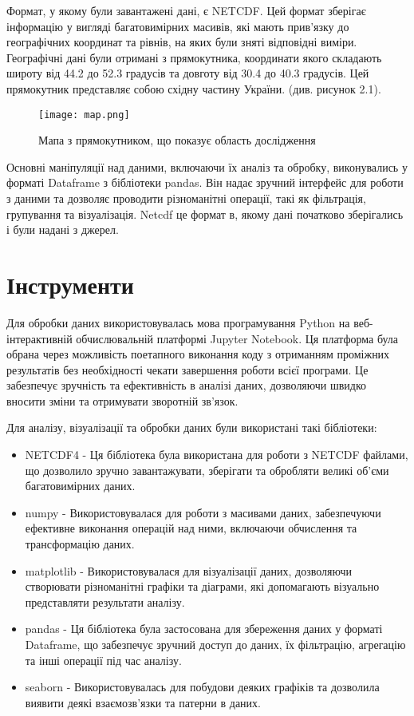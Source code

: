 Формат, у якому були завантажені дані, є NETCDF. 
Цей формат зберігає інформацію у вигляді багатовимірних масивів, які мають прив'язку до географічних координат та рівнів, на яких були зняті відповідні виміри. 
Географічні дані були отримані з прямокутника, координати якого складають широту від 44.2 до 52.3 градусів та довготу від 30.4 до 40.3 градусів. Цей прямокутник представляє собою східну частину України. (див. рисунок 2.1).

\begin{figure}[h]
    \begin{center}
        \texttt{[image: map.png]}
        \caption{Мапа з прямокутником, що показує область дослідження}
    \end{center}
\end{figure}

Основні маніпуляції над даними, включаючи їх аналіз та обробку, виконувались у форматі Dataframe з бібліотеки pandas. 
Він надає зручний інтерфейс для роботи з даними та дозволяє проводити різноманітні операції, такі як фільтрація, групування та візуалізація. 
Netcdf це формат в, якому дані початково зберігались і були надані з джерел.


\section{Інструменти}

Для обробки даних використовувалась мова програмування Python на веб-інтерактивній обчислювальній платформі Jupyter Notebook. 
Ця платформа була обрана через можливість поетапного виконання коду з отриманням проміжних результатів без необхідності чекати завершення роботи всієї програми. 
Це забезпечує зручність та ефективність в аналізі даних, дозволяючи швидко вносити зміни та отримувати зворотній зв'язок.

Для аналізу, візуалізації та обробки даних були використані такі бібліотеки:

\begin{itemize}
    \item NETCDF4 - Ця бібліотека була використана для роботи з NETCDF файлами, що дозволило зручно завантажувати, зберігати та обробляти великі об'єми багатовимірних даних.
    \item numpy - Використовувалася для роботи з масивами даних, забезпечуючи ефективне виконання операцій над ними, включаючи обчислення та трансформацію даних.
    \item matplotlib - Використовувалася для візуалізації даних, дозволяючи створювати різноманітні графіки та діаграми, які допомагають візуально представляти результати аналізу.
    \item pandas - Ця бібліотека була застосована для збереження даних у форматі Dataframe, що забезпечує зручний доступ до даних, їх фільтрацію, агрегацію та інші операції під час аналізу.
    \item seaborn - Використовувалась для побудови деяких графіків та дозволила виявити деякі взаємозв’язки та патерни в даних.
\end{itemize}

